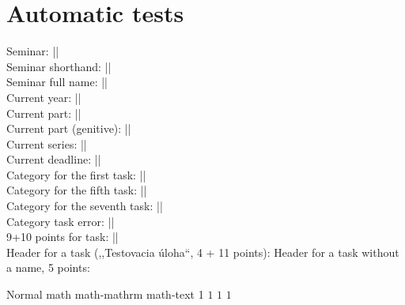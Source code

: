 \newpage
\chapter{\Huge Automatic tests}
    Seminar: |\seminarID|\\
    Seminar shorthand: |\seminarShort|\\
    Seminar full name: |\seminarFull|\\
    
    Current year: |\currentYear|\\
    Current part: |\currentSemester|\\
    Current part (genitive): |\currentSemesterGenitive|\\
    Current series: |\currentSeries|\\        
    Current deadline: |\currentDeadline|\\
    
    Category for the first task: ||\\
    Category for the fifth task: ||\\
    Category for the seventh task: ||\\
    Category task error: ||\\
    
    9+10 points for task: |\formatTaskPoints[9][10]|\\
    Header for a task (,,Testovacia úloha``, 4 + 11 points): 
    Header for a task without a name, 5 points: \createTaskHeader[][5][]
    
    Normal math math-mathrm math-text
    1 $1$ $\mathrm{1}$ $\text{1}$
    
    
